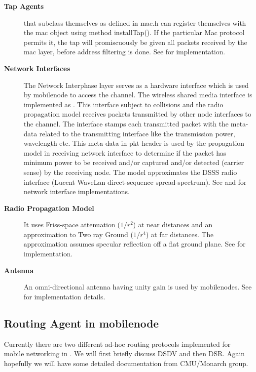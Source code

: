 \begin{description}
\item[{\bf Tap Agents}]  that subclass themselves as  defined in mac.h can register themselves with the mac object using method installTap(). If the particular Mac protocol permits it, the tap will promiscuously be given all packets received by the mac layer, before address filtering is done. See  for  implementation.

\item[{\bf Network Interfaces}] The Network Interphase layer serves as a hardware interface which is used by mobilenode to access the channel. The wireless shared media interface is implemented as . This interface subject to collisions and the radio propagation model receives packets transmitted by other node interfaces to the channel. The interface stamps each transmitted packet with the meta-data related to the transmitting interface like the transmission power, wavelength etc. This meta-data in pkt header is used by the propagation model in receiving network interface to determine if the packet has minimum power to be received and/or captured and/or detected (carrier sense) by the receiving node. The model approximates the DSSS radio interface (Lucent WaveLan direct-sequence spread-spectrum). See  and  for network interface implementations.

\item[{\bf Radio Propagation Model}]  It uses Friss-space attenuation ($1/r^2$) at near distances and an approximation to Two ray Ground ($1/r^4$) at far distances. The approximation assumes specular reflection off a flat ground plane. See  for implementation.

\item[{\bf Antenna}] An omni-directional antenna having unity gain is used by mobilenodes. See  for implementation details.
\end{description}

\subsection{Routing Agent in mobilenode}
\label{sec:mobilenode-routing}

Currently there are two different ad-hoc routing protocols implemented for mobile networking in \ns. We will first briefly discuss DSDV and then DSR. Again hopefully we will have some detailed documentation from CMU/Monarch group.

